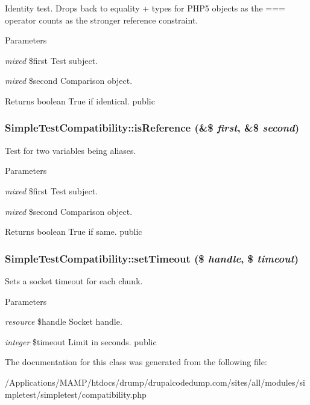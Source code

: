 \label{class_simple_test_compatibility_a51ae07b91b8b9db204faca7c23795417}
Identity test. Drops back to equality + types for PHP5 objects as the === operator counts as the stronger reference constraint. 
\begin{DoxyParams}{Parameters}
\item[{\em mixed}]\$first Test subject. \item[{\em mixed}]\$second Comparison object. \end{DoxyParams}
\begin{DoxyReturn}{Returns}
boolean True if identical.  public 
\end{DoxyReturn}
\hypertarget{class_simple_test_compatibility_a6c75c63b9011298640fbdbbece86626d}{
\subsubsection[{isReference}]{\setlength{\rightskip}{0pt plus 5cm}SimpleTestCompatibility::isReference (\&\$ {\em first}, \/  \&\$ {\em second})}}
\label{class_simple_test_compatibility_a6c75c63b9011298640fbdbbece86626d}
Test for two variables being aliases. 
\begin{DoxyParams}{Parameters}
\item[{\em mixed}]\$first Test subject. \item[{\em mixed}]\$second Comparison object. \end{DoxyParams}
\begin{DoxyReturn}{Returns}
boolean True if same.  public 
\end{DoxyReturn}
\hypertarget{class_simple_test_compatibility_acbacab6c2b39122b60678e33c99d58aa}{
\subsubsection[{setTimeout}]{\setlength{\rightskip}{0pt plus 5cm}SimpleTestCompatibility::setTimeout (\$ {\em handle}, \/  \$ {\em timeout})}}
\label{class_simple_test_compatibility_acbacab6c2b39122b60678e33c99d58aa}
Sets a socket timeout for each chunk. 
\begin{DoxyParams}{Parameters}
\item[{\em resource}]\$handle Socket handle. \item[{\em integer}]\$timeout Limit in seconds.  public \end{DoxyParams}


The documentation for this class was generated from the following file:\begin{DoxyCompactItemize}
\item 
/Applications/MAMP/htdocs/drump/drupalcodedump.com/sites/all/modules/simpletest/simpletest/compatibility.php\end{DoxyCompactItemize}
